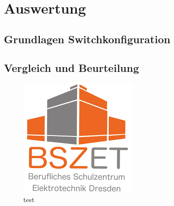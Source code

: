 
\newpage
\section{Auswertung}

    \subsection{Grundlagen Switchkonfiguration}
    
    \newpage
    \subsection{Vergleich und Beurteilung}
    
    \begin{figure}[ht]
        \centering
        \includegraphics[scale=0.6]{bszet-lgo.png}
        \caption{test}
    \end{figure}